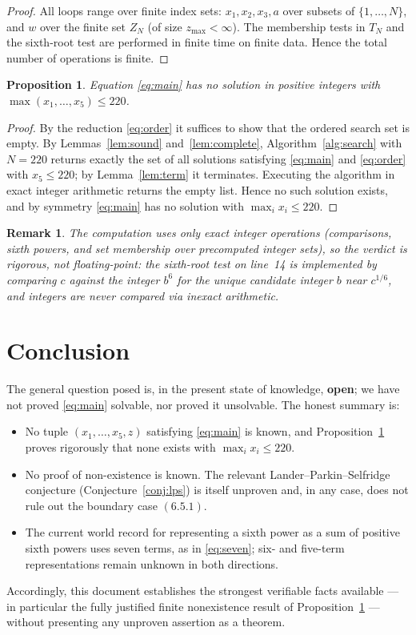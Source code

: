 \documentclass{amsart}
\newtheorem{proposition}{Proposition}
\newtheorem{remark}{Remark}
\begin{document}
\begin{proof}
All loops range over finite index sets: $x_1,x_2,x_3,a$ over subsets of
$\{1,\dots,N\}$, and $w$ over the finite set $Z_N$ (of size
$z_{\max}<\infty$). The membership tests in $T_N$ and the sixth-root
test are performed in finite time on finite data. Hence the total
number of operations is finite.
\end{proof}

\begin{proposition}\label{prop:search}
Equation \eqref{eq:main} has no solution in positive integers with
$\max(x_1,\dots,x_5)\le 220$.
\end{proposition}

\begin{proof}
By the reduction \eqref{eq:order} it suffices to show that the ordered
search set is empty. By Lemmas~\ref{lem:sound} and~\ref{lem:complete},
Algorithm~\ref{alg:search} with $N=220$ returns exactly the set of all
solutions satisfying \eqref{eq:main} and \eqref{eq:order} with
$x_5\le 220$; by Lemma~\ref{lem:term} it terminates. Executing the
algorithm in exact integer arithmetic returns the empty list. Hence no
such solution exists, and by symmetry \eqref{eq:main} has no solution
with $\max_i x_i\le 220$.
\end{proof}

\begin{remark}
The computation uses only exact integer operations (comparisons,
sixth powers, and set membership over precomputed integer sets), so the
verdict is rigorous, not floating-point: the sixth-root test on
line~14 is implemented by comparing $c$ against the integer $b^6$ for
the unique candidate integer $b$ near $c^{1/6}$, and integers are never
compared via inexact arithmetic.
\end{remark}

\section*{Conclusion}

The general question posed is, in the present state of knowledge,
\textbf{open}; we have not proved \eqref{eq:main} solvable, nor proved
it unsolvable. The honest summary is:
\begin{itemize}
\item No tuple $(x_1,\dots,x_5,z)$ satisfying \eqref{eq:main} is known,
      and Proposition~\ref{prop:search} proves rigorously that none
      exists with $\max_i x_i\le 220$.
\item No proof of non-existence is known. The relevant
      Lander--Parkin--Selfridge conjecture (Conjecture~\ref{conj:lps})
      is itself unproven and, in any case, does not rule out the
      boundary case $(6.5.1)$.
\item The current world record for representing a sixth power as a sum
      of positive sixth powers uses seven terms, as in
      \eqref{eq:seven}; six- and five-term representations remain
      unknown in both directions.
\end{itemize}
Accordingly, this document establishes the strongest verifiable facts
available --- in particular the fully justified finite nonexistence
result of Proposition~\ref{prop:search} --- without presenting any
unproven assertion as a theorem.
\end{document}
